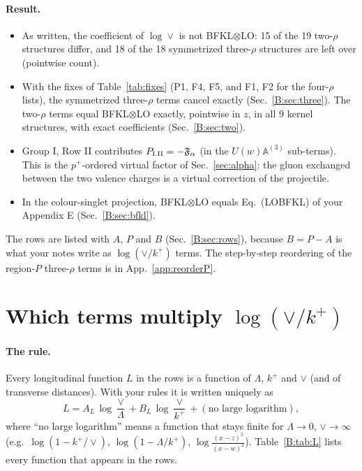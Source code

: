 \documentclass[10pt]{article}
\numberwithin{equation}{section}
\begin{document}
\paragraph{Result.}
\begin{itemize}
\item As written, the coefficient of $\log\vee$ is not BFKL$\otimes$LO: 15 of the 19 two-$\rho$ structures differ, and 18 of the 18 symmetrized three-$\rho$ structures are left over (pointwise count).
\item With the fixes of Table~\ref{tab:fixes} (P1, F4, F5, and F1, F2 for the four-$\rho$ lists), the symmetrized three-$\rho$ terms cancel exactly (Sec.~\ref{B:sec:three}). The two-$\rho$ terms equal BFKL$\otimes$LO exactly, pointwise in $z$, in all 9 kernel structures, with exact coefficients (Sec.~\ref{B:sec:two}).
\item Group I, Row II contributes $P_{\rm I.II}=-\mathfrak F_\alpha$ (in the $U(w)\mathbb A^{(3)}$ sub-terms). This is the $p^+$-ordered virtual factor of Sec.~\ref{sec:alpha}: the gluon exchanged between the two valence charges is a virtual correction of the projectile.
\item In the colour-singlet projection, BFKL$\otimes$LO equals Eq.~(LOBFKL) of your Appendix E (Sec.~\ref{B:sec:bfkl}).
\end{itemize}
The rows are listed with $A$, $P$ and $B$ (Sec.~\ref{B:sec:rows}), because $B=P-A$ is what your notes write as $\log(\vee/k^+)$ terms. The step-by-step reordering of the region-$P$ three-$\rho$ terms is in App.~\ref{app:reorderP}.

\section{Which terms multiply \texorpdfstring{$\log(\vee/k^+)$}{log(vee/k+)}}\label{B:sec:which}
\paragraph{The rule.} Every longitudinal function $L$ in the rows is a function of $\Lambda$, $k^+$ and $\vee$ (and of transverse distances). With your rules it is written uniquely as
\begin{equation}
L=A_L\,\log\frac{\vee}{\Lambda}+B_L\,\log\frac{\vee}{k^+}+(\text{no large logarithm}),
\label{B:eq:AB}
\end{equation}
where ``no large logarithm'' means a function that stays finite for $\Lambda\to0$, $\vee\to\infty$ (e.g.\ $\log(1-k^+/\vee)$, $\log(1-\Lambda/k^+)$, $\log\frac{(x-z)^2}{(x-w)^2}$). Table~\ref{B:tab:L} lists every function that appears in the rows.
\end{document}
